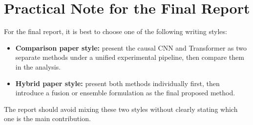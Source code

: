 \documentclass[11pt,a4paper]{article}
\begin{document}
\section{Practical Note for the Final Report}
For the final report, it is best to choose one of the following writing styles:
\begin{itemize}
    \item \textbf{Comparison paper style:} present the causal CNN and Transformer as two separate methods under a unified experimental pipeline, then compare them in the analysis.
    \item \textbf{Hybrid paper style:} present both methods individually first, then introduce a fusion or ensemble formulation as the final proposed method.
\end{itemize}

The report should avoid mixing these two styles without clearly stating which one is the main contribution.
\end{document}
